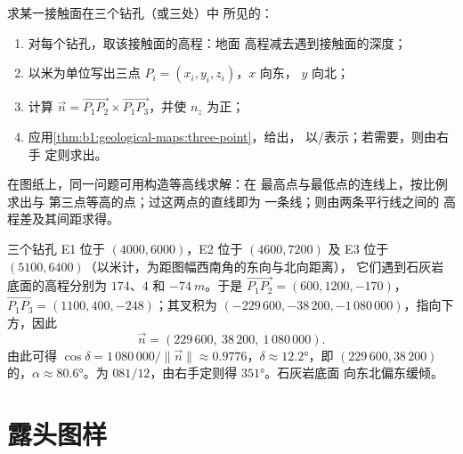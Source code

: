 \begin{method}[三点问题]\label{met:b1:geological-maps:three-point}
求某一接触面在三个钻孔（或三处）中
所见的：
\begin{enumerate}
  \item 对每个钻孔，取该接触面的高程：地面
        高程减去遇到接触面的深度；
  \item 以米为单位写出三点 $P_i = (x_i, y_i, z_i)$，$x$ 向东，
        $y$ 向北；
  \item 计算 $\vec n = \overrightarrow{P_1P_2} \times
        \overrightarrow{P_1P_3}$，并使 $n_z$ 为正；
  \item 应用\cref{thm:b1:geological-maps:three-point}，给出，
        以/表示；若需要，则由右手
        定则求出。
\end{enumerate}
在图纸上，同一问题可用构造等高线求解：在
最高点与最低点的连线上，按比例求出与
第三点等高的点；过这两点的直线即为
一条线；则由两条平行线之间的
高程差及其间距求得。
\end{method}

\begin{example}[瓦尔登背斜的东翼]\label{ex:b1:geological-maps:east}
三个钻孔 E1 位于 $(4000, 6000)$，E2 位于 $(4600, 7200)$ 及 E3 位于
$(5100, 6400)$（以米计，为距图幅西南角的东向与北向距离），
它们遇到石灰岩底面的高程分别为 $174$、$4$ 和 $\qty{-74}{m}$。于是
$\overrightarrow{P_1P_2} = (600, 1200, -170)$，
$\overrightarrow{P_1P_3} = (1100, 400, -248)$；其叉积为
$(-229\,600, -38\,200, -1\,080\,000)$，指向下方，因此
\[
  \vec n = (229\,600,\ 38\,200,\ 1\,080\,000).
\]
由此可得 $\cos\delta = 1\,080\,000/\|\vec n\| \approx
0.9776$，$\delta \approx \ang{12.2}$，即
$(229\,600, 38\,200)$ 的，$\alpha \approx \ang{80.6}$。为
$081/12$，由右手定则得 $\ang{351}$。石灰岩底面
向东北偏东缓倾。
\end{example}

\section{露头图样}


